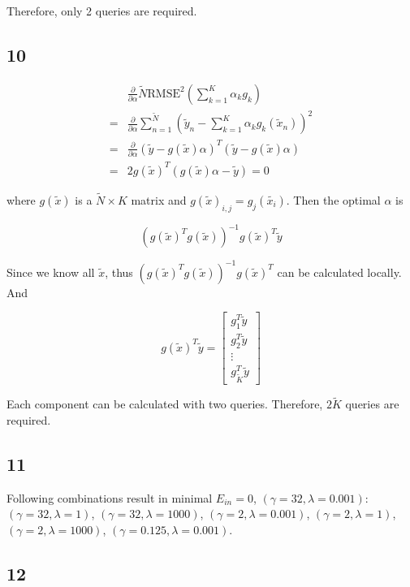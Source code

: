 \documentclass[fleqn,a4paper,12pt]{article}
\begin{document}
Therefore, only 2 queries are required.

\subsection*{10}

\begin{align*}
  &  \frac{\partial}{\partial \alpha} \tilde{N} \mathrm{RMSE}^2(\sum_{k=1}^K \alpha_k g_k) \\
  =& \frac{\partial}{\partial \alpha}  \sum_{n=1}^{\tilde{N}}(\tilde{y}_n - \sum_{k=1}^K \alpha_k g_k(\tilde{x}_n))^2 \\
  =& \frac{\partial}{\partial \alpha}  (\tilde{y} - g(\tilde{x}) \alpha)^T (\tilde{y} - g(\tilde{x}) \alpha) \\
  =& 2 g(\tilde{x})^T (g(\tilde{x})\alpha - \tilde{y}) = 0 
\end{align*}

where $g(\tilde{x})$ is a $\tilde{N} \times K$ matrix and $g(\tilde{x})_{i,j} = g_j(\tilde{x_i})$. Then the optimal $\alpha$ is 

$$(g(\tilde{x})^T g(\tilde{x}))^{-1} g(\tilde{x})^T \tilde{y}$$

Since we know all $\tilde{x}$, thus $(g(\tilde{x})^T g(\tilde{x}))^{-1} g(\tilde{x})^T$ can be calculated locally. And 

$$
  g(\tilde{x})^T \tilde{y} = \begin{bmatrix} g_1^T \tilde{y} \\ g_2^T \tilde{y} \\ \vdots \\ g_{\tilde{K}}^T \tilde{y}  \end{bmatrix}
$$

Each component can be calculated with two queries. Therefore, $2\tilde{K}$ queries are required.

\subsection*{11}

Following combinations result in minimal $E_{in} = 0$, $(\gamma = 32, \lambda = 0.001)$: $(\gamma = 32, \lambda = 1)$, $(\gamma = 32, \lambda = 1000)$, $(\gamma = 2, \lambda = 0.001)$, $(\gamma = 2, \lambda = 1)$, $(\gamma = 2, \lambda = 1000)$, $(\gamma = 0.125, \lambda = 0.001)$.

\subsection*{12}
\end{document}
